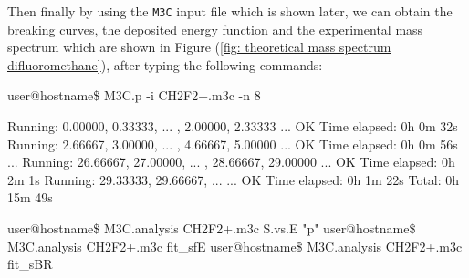 \documentclass[a4paper,12pt]{article}
\begin{document}
Then finally by using the \texttt{M3C} input file which is shown later, we can obtain the breaking curves, the deposited energy function and the experimental mass 
spectrum which are shown in Figure (\ref{fig: theoretical mass spectrum difluoromethane}), after typing the following 
commands:

\begin{shellexec}
user@hostname\$ M3C.p -i CH2F2+.m3c -n 8

Running:    0.00000,   0.33333,  ... ,   2.00000,   2.33333 ... OK     Time elapsed: 0h  0m 32s
Running:    2.66667,   3.00000,  ... ,   4.66667,   5.00000 ... OK     Time elapsed: 0h  0m 56s
...
Running:   26.66667,  27.00000,  ... ,  28.66667,  29.00000 ... OK     Time elapsed: 0h  2m  1s
Running:   29.33333,  29.66667,  ...                        ... OK     Time elapsed: 0h  1m 22s
                                                                              Total: 0h 15m 49s
                                                                              
user@hostname\$ M3C.analysis CH2F2+.m3c S.vs.E "p"
user@hostname\$ M3C.analysis CH2F2+.m3c fit_sfE
user@hostname\$ M3C.analysis CH2F2+.m3c fit_sBR
\end{shellexec}


\end{document}
